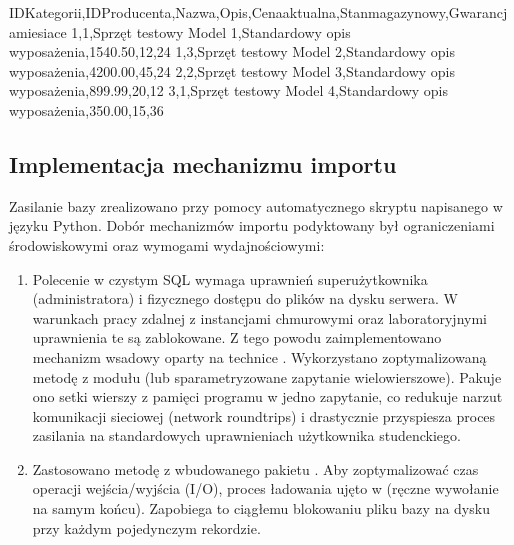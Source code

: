 \documentclass[letterpaper,10pt,polish]{sphinxmanual}
\begin{document}
\begin{sphinxVerbatim}[commandchars=\\\{\}]
ID\PYGZus{}Kategorii,ID\PYGZus{}Producenta,Nazwa,Opis,Cena\PYGZus{}aktualna,Stan\PYGZus{}magazynowy,Gwarancja\PYGZus{}miesiace
1,1,\PYGZdq{}Sprzęt testowy Model 1\PYGZdq{},\PYGZdq{}Standardowy opis wyposażenia\PYGZdq{},1540.50,12,24
1,3,\PYGZdq{}Sprzęt testowy Model 2\PYGZdq{},\PYGZdq{}Standardowy opis wyposażenia\PYGZdq{},4200.00,45,24
2,2,\PYGZdq{}Sprzęt testowy Model 3\PYGZdq{},\PYGZdq{}Standardowy opis wyposażenia\PYGZdq{},899.99,20,12
3,1,\PYGZdq{}Sprzęt testowy Model 4\PYGZdq{},\PYGZdq{}Standardowy opis wyposażenia\PYGZdq{},350.00,15,36
\end{sphinxVerbatim}


\subsection{Implementacja mechanizmu importu}
\label{\detokenize{rozdzia_u0142_4/BD_WprowadzanieBD/index:implementacja-mechanizmu-importu}}
\sphinxAtStartPar
Zasilanie bazy zrealizowano przy pomocy automatycznego skryptu napisanego w języku Python. Dobór mechanizmów importu podyktowany był ograniczeniami środowiskowymi oraz wymogami wydajnościowymi:
\begin{enumerate}
%
\item {} 
\sphinxAtStartPar
{} Polecenie  w czystym SQL wymaga uprawnień superużytkownika (administratora) i fizycznego dostępu do plików na dysku serwera. W warunkach pracy zdalnej z instancjami chmurowymi oraz laboratoryjnymi uprawnienia te są zablokowane. Z tego powodu zaimplementowano mechanizm wsadowy oparty na technice . Wykorzystano zoptymalizowaną metodę  z modułu  (lub sparametryzowane zapytanie wielowierszowe). Pakuje ono setki wierszy z pamięci programu w jedno zapytanie, co redukuje narzut komunikacji sieciowej (network round\sphinxhyphen{}trips) i drastycznie przyspiesza proces zasilania na standardowych uprawnieniach użytkownika studenckiego.

\item {} 
\sphinxAtStartPar
{} Zastosowano metodę  z wbudowanego pakietu . Aby zoptymalizować czas operacji wejścia/wyjścia (I/O), proces ładowania ujęto w  (ręczne wywołanie  na samym końcu). Zapobiega to ciągłemu blokowaniu pliku bazy na dysku przy każdym pojedynczym rekordzie.

\end{enumerate}
\end{document}
